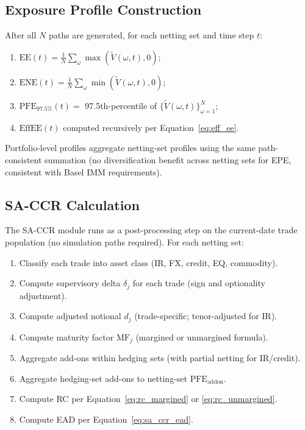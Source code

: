 \documentclass[11pt,a4paper]{article}
\begin{document}
\subsection{Exposure Profile Construction}

After all $N$ paths are generated, for each netting set and time step $t$:

\begin{enumerate}[noitemsep]
  \item $\text{EE}(t) = \frac{1}{N} \sum_\omega \max(\tilde{V}(\omega, t), 0)$;
  \item $\text{ENE}(t) = \frac{1}{N} \sum_\omega \min(\tilde{V}(\omega, t), 0)$;
  \item $\text{PFE}_{97.5\%}(t) = $ 97.5th-percentile of
        $\{\tilde{V}(\omega, t)\}_{\omega=1}^N$;
  \item $\text{EffEE}(t)$ computed recursively per Equation~\ref{eq:eff_ee}.
\end{enumerate}

Portfolio-level profiles aggregate netting-set profiles using the same
path-consistent summation (no diversification benefit across netting sets for
EPE, consistent with Basel IMM requirements).

\subsection{SA-CCR Calculation}

The SA-CCR module runs as a post-processing step on the current-date trade
population (no simulation paths required). For each netting set:

\begin{enumerate}[noitemsep]
  \item Classify each trade into asset class (IR, FX, credit, EQ, commodity).
  \item Compute supervisory delta $\delta_j$ for each trade (sign and optionality
        adjustment).
  \item Compute adjusted notional $d_j$ (trade-specific; tenor-adjusted for IR).
  \item Compute maturity factor $\text{MF}_j$ (margined or unmargined formula).
  \item Aggregate add-ons within hedging sets (with partial netting for IR/credit).
  \item Aggregate hedging-set add-ons to netting-set $\text{PFE}_{\text{addon}}$.
  \item Compute RC per Equation~\ref{eq:rc_margined} or \ref{eq:rc_unmargined}.
  \item Compute EAD per Equation~\ref{eq:sa_ccr_ead}.
\end{enumerate}
\end{document}
